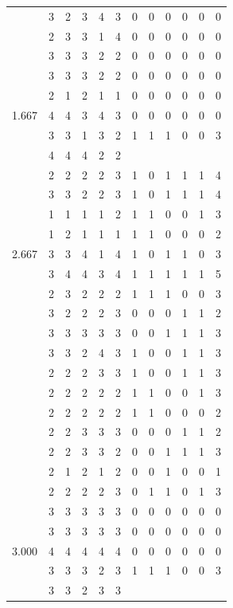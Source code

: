 \documentclass[]{msu-thesis}
\theoremstyle{definition}
\theoremstyle{definition}
\theoremstyle{definition}
\theoremstyle{remark}
\begin{document}
\begin{table}
{\begin{tabular}[t]{rrrrrrrrrrrr}
 & 3 & 2 & 3 & 4 & 3 & 0 & 0 & 0 & 0 & 0 & 0\\
 & 2 & 3 & 3 & 1 & 4 & 0 & 0 & 0 & 0 & 0 & 0\\
 & 3 & 3 & 3 & 2 & 2 & 0 & 0 & 0 & 0 & 0 & 0\\
 & 3 & 3 & 3 & 2 & 2 & 0 & 0 & 0 & 0 & 0 & 0\\
 & 2 & 1 & 2 & 1 & 1 & 0 & 0 & 0 & 0 & 0 & 0\\
1.667 & 4 & 4 & 3 & 4 & 3 & 0 & 0 & 0 & 0 & 0 & 0\\
 & 3 & 3 & 1 & 3 & 2 & 1 & 1 & 1 & 0 & 0 & 3\\
 & 4 & 4 & 4 & 2 & 2 &  &  &  &  &  & \\
 & 2 & 2 & 2 & 2 & 3 & 1 & 0 & 1 & 1 & 1 & 4\\
 & 3 & 3 & 2 & 2 & 3 & 1 & 0 & 1 & 1 & 1 & 4\\
 & 1 & 1 & 1 & 1 & 2 & 1 & 1 & 0 & 0 & 1 & 3\\
 & 1 & 2 & 1 & 1 & 1 & 1 & 1 & 0 & 0 & 0 & 2\\
2.667 & 3 & 3 & 4 & 1 & 4 & 1 & 0 & 1 & 1 & 0 & 3\\
 & 3 & 4 & 4 & 3 & 4 & 1 & 1 & 1 & 1 & 1 & 5\\
 & 2 & 3 & 2 & 2 & 2 & 1 & 1 & 1 & 0 & 0 & 3\\
 & 3 & 2 & 2 & 2 & 3 & 0 & 0 & 0 & 1 & 1 & 2\\
 & 3 & 3 & 3 & 3 & 3 & 0 & 0 & 1 & 1 & 1 & 3\\
 & 3 & 3 & 2 & 4 & 3 & 1 & 0 & 0 & 1 & 1 & 3\\
 & 2 & 2 & 2 & 3 & 3 & 1 & 0 & 0 & 1 & 1 & 3\\
 & 2 & 2 & 2 & 2 & 2 & 1 & 1 & 0 & 0 & 1 & 3\\
 & 2 & 2 & 2 & 2 & 2 & 1 & 1 & 0 & 0 & 0 & 2\\
 & 2 & 2 & 3 & 3 & 3 & 0 & 0 & 0 & 1 & 1 & 2\\
 & 2 & 2 & 3 & 3 & 2 & 0 & 0 & 1 & 1 & 1 & 3\\
 & 2 & 1 & 2 & 1 & 2 & 0 & 0 & 1 & 0 & 0 & 1\\
 & 2 & 2 & 2 & 2 & 3 & 0 & 1 & 1 & 0 & 1 & 3\\
 & 3 & 3 & 3 & 3 & 3 & 0 & 0 & 0 & 0 & 0 & 0\\
 & 3 & 3 & 3 & 3 & 3 & 0 & 0 & 0 & 0 & 0 & 0\\
3.000 & 4 & 4 & 4 & 4 & 4 & 0 & 0 & 0 & 0 & 0 & 0\\
 & 3 & 3 & 3 & 2 & 3 & 1 & 1 & 1 & 0 & 0 & 3\\
 & 3 & 3 & 2 & 3 & 3 &  &  &  &  &  & \\

\end{tabular}}
\end{table}
\end{document}
